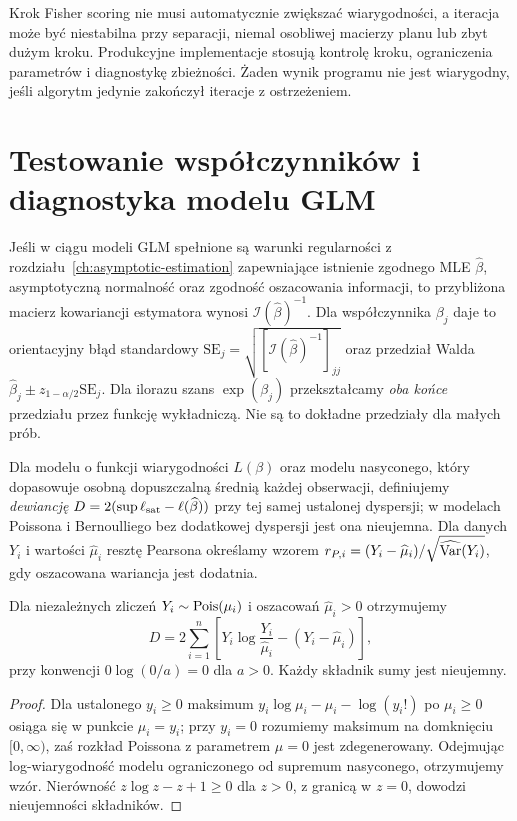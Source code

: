 \begin{uwaga}
Krok Fisher scoring nie musi automatycznie zwiększać
wiarygodności, a iteracja może być niestabilna przy
separacji, niemal osobliwej macierzy planu lub zbyt
dużym kroku. Produkcyjne implementacje stosują
kontrolę kroku, ograniczenia parametrów i diagnostykę
zbieżności. Żaden wynik programu nie jest wiarygodny,
jeśli algorytm jedynie zakończył iteracje z ostrzeżeniem.
\end{uwaga}

\section{Testowanie współczynników i diagnostyka modelu GLM}
\begin{stwierdzenie}
\label{prop:glm-asymptotic-se}
Jeśli w ciągu modeli GLM spełnione są warunki
regularności z rozdziału~\ref{ch:asymptotic-estimation} zapewniające
istnienie zgodnego MLE $\widehat\beta$, asymptotyczną
normalność oraz zgodność oszacowania informacji,
to przybliżona macierz kowariancji estymatora wynosi
$\mathcal I(\widehat\beta)^{-1}$. Dla współczynnika
$\beta_j$ daje to orientacyjny błąd standardowy
$\mathrm{SE}_j=\sqrt{[\mathcal I(\widehat\beta)^{-1}]_{jj}}$
oraz przedział Walda $\widehat\beta_j\pm
z_{1-\alpha/2}\mathrm{SE}_j$.
Dla ilorazu szans $\exp(\beta_j)$ przekształcamy
\emph{oba końce} przedziału przez funkcję wykładniczą.
Nie są to dokładne przedziały dla małych prób.
\end{stwierdzenie}

\begin{definicja}
Dla modelu o funkcji wiarygodności $L(\beta)$ oraz
modelu nasyconego, który dopasowuje osobną dopuszczalną
średnią każdej obserwacji, definiujemy \emph{dewiancję}
$D=2(\sup\ell_{\rm sat}-\ell(\widehat\beta))$
przy tej samej ustalonej dyspersji; w modelach
Poissona i Bernoulliego bez dodatkowej dyspersji
jest ona nieujemna. Dla danych $Y_i$ i wartości
$\widehat\mu_i$ resztę Pearsona określamy wzorem
$r_{P,i}=(Y_i-\widehat\mu_i)/\sqrt{\widehat{\operatorname{Var}}(Y_i)}$,
gdy oszacowana wariancja jest dodatnia.
\end{definicja}

\begin{stwierdzenie}
\label{prop:poisson-deviance}
Dla niezależnych zliczeń $Y_i\sim\operatorname{Pois}(\mu_i)$ i
oszacowań $\widehat\mu_i>0$ otrzymujemy
\[
 D=2\sum_{i=1}^n\left[
 Y_i\log\frac{Y_i}{\widehat\mu_i}
 -(Y_i-\widehat\mu_i)\right],
\]
przy konwencji $0\log(0/a)=0$ dla $a>0$.
Każdy składnik sumy jest nieujemny.
\end{stwierdzenie}
\begin{proof}
Dla ustalonego $y_i\ge0$ maksimum
$y_i\log\mu_i-\mu_i-\log(y_i!)$
po $\mu_i\ge0$ osiąga się w punkcie $\mu_i=y_i$;
przy $y_i=0$ rozumiemy maksimum na domknięciu
$[0,\infty)$, zaś rozkład Poissona z parametrem
$\mu=0$ jest zdegenerowany. Odejmując log-wiarygodność
modelu ograniczonego od supremum nasyconego, otrzymujemy wzór.
Nierówność $z\log z-z+1\ge0$ dla $z>0$,
z granicą w $z=0$, dowodzi nieujemności składników.
\end{proof}

